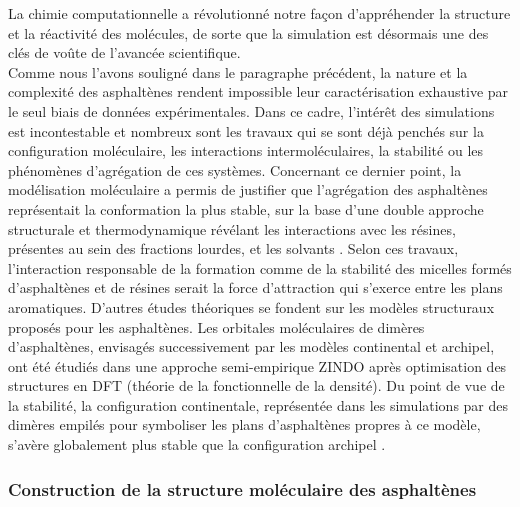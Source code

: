 La chimie computationnelle a révolutionné notre façon d'appréhender la structure et la réactivité des molécules, de sorte que la simulation est désormais une des clés de voûte de l'avancée scientifique. \\
Comme nous l'avons souligné dans le paragraphe précédent, la nature et la complexité des asphaltènes rendent impossible leur caractérisation exhaustive par le seul biais de données expérimentales. Dans ce cadre, l'intérêt des simulations est incontestable et nombreux sont les travaux qui se sont déjà penchés sur la configuration moléculaire, les interactions intermoléculaires, la stabilité ou les phénomènes d'agrégation de ces systèmes.  
Concernant ce dernier point, la modélisation moléculaire a permis de justifier que l'agrégation des asphaltènes représentait la conformation la plus stable, sur la base d'une double approche structurale et thermodynamique révélant les interactions avec les résines, présentes au sein des fractions lourdes, et les solvants \cite{murgich1996molecular}. Selon ces travaux, l'interaction responsable de la formation comme de la stabilité des micelles formés d'asphaltènes et de résines serait la force d'attraction qui s'exerce entre les plans aromatiques. 
D'autres études théoriques se fondent sur les modèles structuraux proposés pour les asphaltènes. Les orbitales moléculaires de dimères d'asphaltènes, envisagés successivement par les modèles continental et archipel, ont été étudiés dans une approche semi-empirique ZINDO après optimisation des structures en DFT (théorie de la fonctionnelle de la densité). Du point de vue de la stabilité, la configuration continentale, représentée dans les simulations par des dimères empilés pour symboliser les plans d'asphaltènes propres à ce modèle, s'avère globalement plus stable que la configuration archipel \cite{alvarez2013island}. 


\subsubsection{Construction de la structure moléculaire des asphaltènes}

